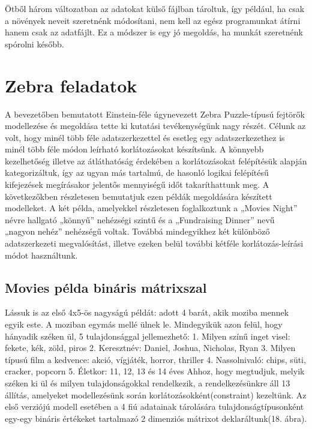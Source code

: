 \documentclass[12pt,a4paper,twoside, openright]{report}
\begin{document}
				
				Ötből három változatban az adatokat külső fájlban tároltuk, így például, ha csak a növények neveit szeretnénk módosítani, nem kell az egész programunkat átírni hanem csak az adatfájlt. Ez a módszer is egy jó megoldás, ha munkát szeretnénk spórolni később.
				
		\section{Zebra feladatok}
			A bevezetőben bemutatott Einstein-féle úgynevezett Zebra Puzzle-típusú fejtörők\cite{zebra} modellezése és megoldása tette ki kutatási tevékenységünk nagy részét. Célunk az volt, hogy minél több féle adatszerkezettel és esetleg egy adatszerkezethez is minél több féle módon leírható korlátozásokat készítsünk. A könnyebb kezelhetőség illetve az átláthatóság érdekében a korlátozásokat felépítésük alapján kategorizáltuk, így az ugyan más tartalmú, de hasonló logikai felépítésű kifejezések megírásakor jelentős mennyiségű időt takaríthattunk meg.
			A következőkben részletesen bemutatjuk ezen példák megoldására készített modelleket. A két példa, amelyekkel részletesen foglalkoztunk a „Movies Night” névre hallgató „könnyű” nehézségi szintű és a „Fundraising Dinner” nevű „nagyon nehéz” nehézségű voltak. Továbbá mindegyikhez két különböző adatszerkezeti megvalósítást, illetve ezeken belül további kétféle korlátozás-leírási módot használtunk.
			
			\subsection{Movies példa bináris mátrixszal}
				Lássuk is az első 4x5-ös nagyságú példát: adott 4 barát, akik moziba mennek egyik este. A moziban egymás mellé ülnek le. Mindegyikük azon felül, hogy hányadik széken ül, 5 tulajdonsággal jellemezhető: 
					1.	Milyen színű inget visel: fekete, kék, zöld, piros
					2.	Keresztnév: Daniel, Joshua, Nicholas, Ryan
					3.	Milyen típusú film a kedvence: akció, vígjáték, horror, thriller
					4.	Nassolnivaló: chips, süti, cracker, popcorn
					5.	Életkor: 11, 12, 13 és 14 éves
				Ahhoz, hogy megtudjuk, melyik széken ki ül és milyen tulajdonságokkal rendelkezik, a rendelkezésünkre áll 13 állítás, amelyeket modellezésünk során korlátozásokként(constraint) kezeltünk.
				Az első verziójú modell esetében a 4 fiú adatainak tárolására tulajdonságtípusonként egy-egy bináris értékeket tartalmazó 2 dimenziós mátrixot deklaráltunk(18. ábra).
				
\end{document}
